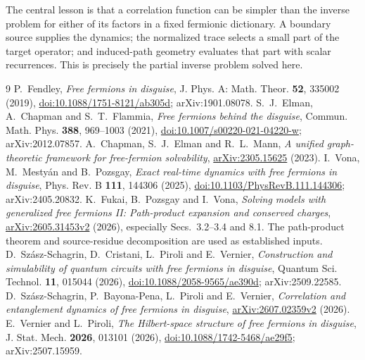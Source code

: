 \documentclass[11pt,a4paper]{article}
\begin{document}
The central lesson is that a correlation function can be simpler than the inverse problem for either of its factors in a fixed fermionic dictionary. A boundary source supplies the dynamics; the normalized trace selects a small part of the target operator; and induced-path geometry evaluates that part with scalar recurrences. This is precisely the partial inverse problem solved here.

\begin{thebibliography}{9}\small
{}
P.~Fendley, \emph{Free fermions in disguise}, J. Phys. A: Math. Theor. \textbf{52}, 335002 (2019), \href{https://doi.org/10.1088/1751-8121/ab305d}{doi:10.1088/1751-8121/ab305d}; arXiv:1901.08078.
S.~J.~Elman, A.~Chapman and S.~T.~Flammia, \emph{Free fermions behind the disguise}, Commun. Math. Phys. \textbf{388}, 969--1003 (2021), \href{https://doi.org/10.1007/s00220-021-04220-w}{doi:10.1007/s00220-021-04220-w}; arXiv:2012.07857.
A.~Chapman, S.~J.~Elman and R.~L.~Mann, \emph{A unified graph-theoretic framework for free-fermion solvability}, \href{https://arxiv.org/abs/2305.15625}{arXiv:2305.15625} (2023).
I.~Vona, M.~Mesty\'an and B.~Pozsgay, \emph{Exact real-time dynamics with free fermions in disguise}, Phys. Rev. B \textbf{111}, 144306 (2025), \href{https://doi.org/10.1103/PhysRevB.111.144306}{doi:10.1103/PhysRevB.111.144306}; arXiv:2405.20832.
K.~Fukai, B.~Pozsgay and I.~Vona, \emph{Solving models with generalized free fermions II: Path-product expansion and conserved charges}, \href{https://arxiv.org/abs/2605.31453v2}{arXiv:2605.31453v2} (2026), especially Secs.~3.2--3.4 and 8.1. The path-product theorem and source-residue decomposition are used as established inputs.
D.~Sz\'asz-Schagrin, D.~Cristani, L.~Piroli and E.~Vernier, \emph{Construction and simulability of quantum circuits with free fermions in disguise}, Quantum Sci. Technol. \textbf{11}, 015044 (2026), \href{https://doi.org/10.1088/2058-9565/ae390d}{doi:10.1088/2058-9565/ae390d}; arXiv:2509.22585.
D.~Sz\'asz-Schagrin, P.~Bayona-Pena, L.~Piroli and E.~Vernier, \emph{Correlation and entanglement dynamics of free fermions in disguise}, \href{https://arxiv.org/abs/2607.02359v2}{arXiv:2607.02359v2} (2026).
E.~Vernier and L.~Piroli, \emph{The Hilbert-space structure of free fermions in disguise}, J. Stat. Mech. \textbf{2026}, 013101 (2026), \href{https://doi.org/10.1088/1742-5468/ae29f5}{doi:10.1088/1742-5468/ae29f5}; arXiv:2507.15959.
\end{thebibliography}
\end{document}
